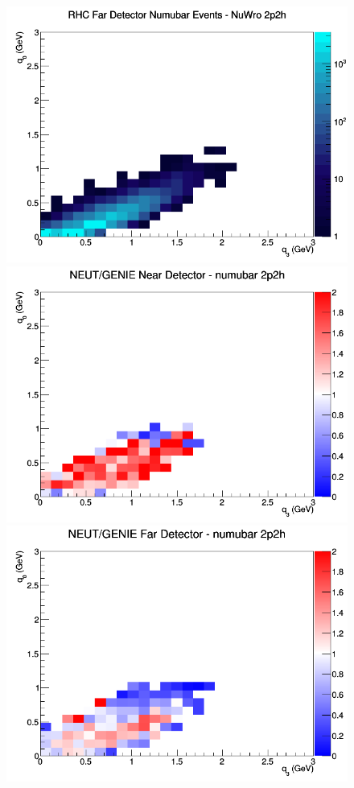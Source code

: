 \documentclass[12pt]{article}
\begin{document}
\begin{figure}[h]
\endminipage
{}
\includegraphics[width=\linewidth]{eff_q0_q3/FGT/2p2h_RHC_FD_numubar_q3_q0_NuWro.png}
\endminipage
\newline
{}
\includegraphics[width=\linewidth]{eff_q0_q3/FGT/ratios/2p2h_NEUT_GENIE_numubar_near_q3_q0.png}
\endminipage
{}
\includegraphics[width=\linewidth]{eff_q0_q3/FGT/ratios/2p2h_NEUT_GENIE_numubar_far_q3_q0.png}

\end{figure}
\end{document}
